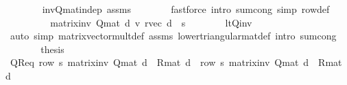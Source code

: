 \begin{isabellebody}
\ \ \ \ \ \ \isamarkupfalse%
\ inv{\isacharunderscore}{\kern0pt}Q{\isacharunderscore}{\kern0pt}mat{\isacharunderscore}{\kern0pt}indep\ assms\isanewline
\ \ \ \ \ \ \isamarkupfalse%
\ {\isacharparenleft}{\kern0pt}fastforce\ intro{\isacharbang}{\kern0pt}{\isacharcolon}{\kern0pt}\ sum{\isachardot}{\kern0pt}cong\ simp{\isacharcolon}{\kern0pt}\ row{\isacharunderscore}{\kern0pt}def{\isacharparenright}{\kern0pt}\isanewline
\ \ \ \ \isamarkupfalse%
\ \isamarkupfalse%
\ {\isachardoublequoteopen}{\isasymdots}\ {\isacharequal}{\kern0pt}\ {\isacharparenleft}{\kern0pt}matrix{\isacharunderscore}{\kern0pt}inv\ {\isacharparenleft}{\kern0pt}Q{\isacharunderscore}{\kern0pt}mat\ d{\isacharprime}{\kern0pt}{\isacharparenright}{\kern0pt}\ {\isacharasterisk}{\kern0pt}v\ r{\isacharunderscore}{\kern0pt}vec\ d{\isacharprime}{\kern0pt}{\isacharparenright}{\kern0pt}\ {\isachardollar}{\kern0pt}\ s{\isachardoublequoteclose}\isanewline
\ \ \ \ \ \ \isamarkupfalse%
\ lt{\isacharunderscore}{\kern0pt}Q{\isacharunderscore}{\kern0pt}inv\ \isanewline
\ \ \ \ \ \ \isamarkupfalse%
\ {\isacharparenleft}{\kern0pt}auto\ simp{\isacharcolon}{\kern0pt}\ matrix{\isacharunderscore}{\kern0pt}vector{\isacharunderscore}{\kern0pt}mult{\isacharunderscore}{\kern0pt}def\ assms\ lower{\isacharunderscore}{\kern0pt}triangular{\isacharunderscore}{\kern0pt}mat{\isacharunderscore}{\kern0pt}def\ intro{\isacharbang}{\kern0pt}{\isacharcolon}{\kern0pt}\ sum{\isachardot}{\kern0pt}cong{\isacharparenright}{\kern0pt}\isanewline
\ \ \ \ \isamarkupfalse%
\ \isamarkupfalse%
\ {\isacharquery}{\kern0pt}thesis\isacommand{{\isachardot}{\kern0pt}}\isamarkupfalse%
\isanewline
\ \ \isamarkupfalse%
\isanewline
\isanewline
\ \ \isamarkupfalse%
\ QR{\isacharunderscore}{\kern0pt}eq{\isacharcolon}{\kern0pt}\ {\isachardoublequoteopen}row\ s\ {\isacharparenleft}{\kern0pt}matrix{\isacharunderscore}{\kern0pt}inv\ {\isacharparenleft}{\kern0pt}Q{\isacharunderscore}{\kern0pt}mat\ d{\isacharparenright}{\kern0pt}\ {\isacharasterisk}{\kern0pt}{\isacharasterisk}{\kern0pt}\ R{\isacharunderscore}{\kern0pt}mat\ d{\isacharparenright}{\kern0pt}\ {\isacharequal}{\kern0pt}\ row\ s\ {\isacharparenleft}{\kern0pt}matrix{\isacharunderscore}{\kern0pt}inv\ {\isacharparenleft}{\kern0pt}Q{\isacharunderscore}{\kern0pt}mat\ d{\isacharprime}{\kern0pt}{\isacharparenright}{\kern0pt}\ {\isacharasterisk}{\kern0pt}{\isacharasterisk}{\kern0pt}\ R{\isacharunderscore}{\kern0pt}mat\ d{\isacharprime}{\kern0pt}{\isacharparenright}{\kern0pt}{\isachardoublequoteclose}\isanewline

\end{isabellebody}

